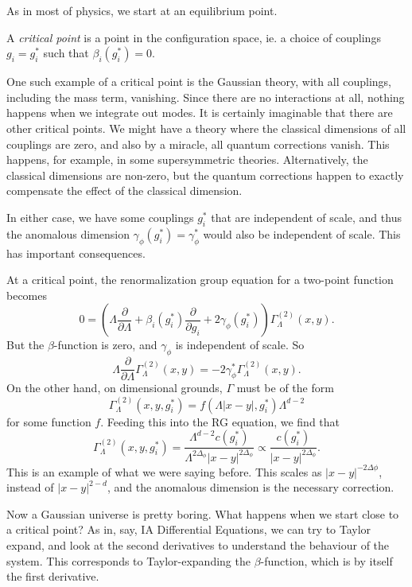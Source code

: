 \documentclass[a4paper]{article}
\begin{document}
As in most of physics, we start at an equilibrium point.
\begin{defi}
  A \emph{critical point} is a point in the configuration space, ie. a choice of couplings $g_i = g_i^*$ such that $\beta_i(g_i^*) = 0$.
\end{defi}
One such example of a critical point is the Gaussian theory, with all couplings, including the mass term, vanishing. Since there are no interactions at all, nothing happens when we integrate out modes. It is certainly imaginable that there are other critical points. We might have a theory where the classical dimensions of all couplings are zero, and also by a miracle, all quantum corrections vanish. This happens, for example, in some supersymmetric theories. Alternatively, the classical dimensions are non-zero, but the quantum corrections happen to exactly compensate the effect of the classical dimension.

In either case, we have some couplings $g_i^*$ that are independent of scale, and thus the anomalous dimension $\gamma_\phi(g_i^*) = \gamma_\phi^*$ would also be independent of scale. This has important consequences.
\begin{eg}
  At a critical point, the renormalization group equation for a two-point function becomes
  \[
    0 = \left(\Lambda \frac{\partial}{\partial \Lambda} + \beta_i(g_i^*) \frac{\partial}{\partial g_i} + 2 \gamma_\phi (g_i^*)\right) \Gamma_\Lambda^{(2)} (x, y).
  \]
  But the $\beta$-function is zero, and $\gamma_\phi$ is independent of scale. So
  \[
    \Lambda \frac{\partial}{\partial \Lambda} \Gamma^{(2)}_\Lambda(x, y) = -2 \gamma_\phi^* \Gamma_\Lambda^{(2)}(x, y).
  \]
  On the other hand, on dimensional grounds, $\Gamma$ must be of the form
  \[
    \Gamma_\Lambda^{(2)} (x, y, g_i^*) = f(\Lambda|x - y|, g_i^*) \Lambda^{d - 2}
  \]
  for some function $f$. Feeding this into the RG equation, we find that
  \[
    \Gamma_\Lambda^{(2)} (x, y, g_i^*) = \frac{\Lambda^{d - 2} c(g_i^*)}{ \Lambda^{2 \Delta_\phi} |x - y|^{2 \Delta_\phi}} \propto \frac{c(g_i^*)}{|x - y|^{2 \Delta_\phi}}.
  \]
  This is an example of what we were saying before. This scales as $|x - y|^{-2 \Delta \phi}$, instead of $|x - y|^{2 - d}$, and the anomalous dimension is the necessary correction.
\end{eg}

Now a Gaussian universe is pretty boring. What happens when we start close to a critical point? As in, say, IA Differential Equations, we can try to Taylor expand, and look at the second derivatives to understand the behaviour of the system. This corresponds to Taylor-expanding the $\beta$-function, which is by itself the first derivative.
\end{document}

